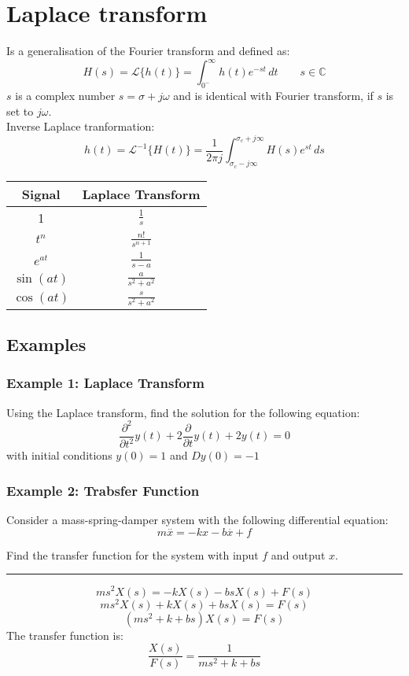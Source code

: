 \section{Laplace transform}
Is a generalisation of the Fourier transform and defined as:
$$H(s)=\mathcal{L}\{h(t)\}=\int_{0^-}^{\infty}h(t)e^{ -st }  \, dt \quad\quad s \in\mathbb{C}$$
$s$ is a complex number $s=\sigma+j\omega$ and is identical with Fourier transform, if $s$ is set to $j\omega$.\\
Inverse Laplace tranformation:
$$h(t)=\mathcal{L}^{-1}\{H(t)\}=\frac{1}{2\pi j}\int_{\sigma_{c}-j\infty}^{\sigma_{c}+j\infty} H(s)e^{ st } \, ds $$
\begin{table}[h]
\centering
\begin{tabular}{|c|c|}
\hline
\cellcolor[HTML]{C0C0C0} \textbf{Signal}& \cellcolor[HTML]{C0C0C0}\textbf{Laplace Transform}  \\ \hline
1&$\frac{1}{s}$ \\ \hline
$t^n$&$\frac{n!}{s^{n+1}}$ \\ \hline
$e^{at}$& $\frac{1}{s-a}$ \\ \hline
$\sin(at)$&$\frac{a}{s^2+a^2}$ \\ \hline
$\cos(at)$&$\frac{s}{s^2+a^2}$ \\ \hline
\end{tabular}
\end{table}
\subsection{Examples}
\subsubsection{Example 1: Laplace Transform}
Using the Laplace transform, find the solution for the following equation:
$$\frac{\partial^{2}}{\partial t^{2}}y(t)+2\frac{\partial}{\partial t}y(t)+2y(t)=0$$
with initial conditions $y (0) = 1$ and $Dy (0) = -1$
\subsubsection{Example 2: Trabsfer Function}
Consider a mass-spring-damper system with the following differential equation:
$$m\overset{..}{x}=-kx-b\overset{.}{x}+f$$

Find the transfer function for the system with input $f$ and output $x$.

\rule{\textwidth}{0.5pt}

$$ms^2X(s)=-kX(s)-bsX(s)+F(s)$$
$$ms^2X(s)+kX(s)+bsX(s)=F(s)$$
$$(ms^2+k+bs)X(s)=F(s)$$
The transfer function is:
$$\frac{X(s)}{F(s)}=\displaystyle\frac{1}{ms^2+k+bs}$$

